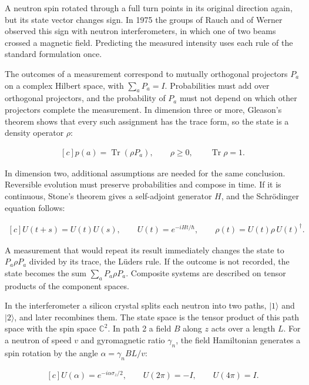 \documentclass[11pt,oneside]{book}
\newenvironment{centeredalign}{\[\begin{gathered}[c]}{\end{gathered}\]}
\begin{document}
\label{topic:mathematical-formulation-of-quantum-mechanics}

A neutron spin rotated through a full turn points in its original direction again, but its state vector changes sign. In 1975 the groups of Rauch and of Werner observed this sign with neutron interferometers, in which one of two beams crossed a magnetic field. Predicting the measured intensity uses each rule of the standard formulation once.

The outcomes of a measurement correspond to mutually orthogonal projectors \(P_a\) on a complex Hilbert space, with \(\sum_aP_a=I\). Probabilities must add over orthogonal projectors, and the probability of \(P_a\) must not depend on which other projectors complete the measurement. In dimension three or more, Gleason's theorem shows that every such assignment has the trace form, so the state is a density operator \(\rho\):

\begin{centeredalign}
p(a)=\operatorname{Tr}(\rho P_a),\qquad \rho\geq0,\qquad \operatorname{Tr}\rho=1.
\end{centeredalign}

In dimension two, additional assumptions are needed for the same conclusion. Reversible evolution must preserve probabilities and compose in time. If it is continuous, Stone's theorem gives a self-adjoint generator \(H\), and the Schrödinger equation follows:

\begin{centeredalign}
U(t+s)=U(t)U(s),\qquad U(t)=e^{-iHt/\hbar},\qquad
\rho(t)=U(t)\rho\,U(t)^\dagger.
\end{centeredalign}

A measurement that would repeat its result immediately changes the state to \(P_a\rho P_a\) divided by its trace, the Lüders rule. If the outcome is not recorded, the state becomes the sum \(\sum_aP_a\rho P_a\). Composite systems are described on tensor products of the component spaces.

In the interferometer a silicon crystal splits each neutron into two paths, \(|1\rangle\) and \(|2\rangle\), and later recombines them. The state space is the tensor product of this path space with the spin space \(\mathbb C^2\). In path 2 a field \(B\) along \(z\) acts over a length \(L\). For a neutron of speed \(v\) and gyromagnetic ratio \(\gamma_n\), the field Hamiltonian generates a spin rotation by the angle \(\alpha=\gamma_nBL/v\):

\begin{centeredalign}
U(\alpha)=e^{-i\alpha\sigma_z/2},\qquad U(2\pi)=-I,\qquad U(4\pi)=I.
\end{centeredalign}
\end{document}
